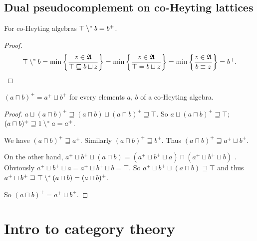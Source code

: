 \subsection{Dual pseudocomplement on co-Heyting lattices}
\begin{thm}
For co-Heyting algebras $\top\setminus^{\ast} b=b^{+}$.\end{thm}
\begin{proof}
~
\[
\top\setminus^{\ast} b=\min\left\{ \frac{z\in\mathfrak{A}}{\top\sqsubseteq b\sqcup z}\right\}=\min\left\{ \frac{z\in\mathfrak{A}}{\top=b\sqcup z}\right\}=\min\left\{ \frac{z\in\mathfrak{A}}{b\equiv z}\right\}=b^{+}.
\]
\end{proof}
\begin{thm}
$(a\sqcap b)^{+}=a^{+}\sqcup b^{+}$ for every elements $a$, $b$
of a co-Heyting algebra.\end{thm}
\begin{proof}
$a\sqcup(a\sqcap b)^{+}\sqsupseteq(a\sqcap b)\sqcup(a\sqcap b)^{+}\sqsupseteq\top$.
So $a\sqcup(a\sqcap b)^{+}\sqsupseteq\top$; $(a\sqcap b)^{+}\sqsupseteq1\setminus^{\ast} a=a^{+}$.

We have $(a\sqcap b)^{+}\sqsupseteq a^{+}$. Similarly $(a\sqcap b)^{+}\sqsupseteq b^{+}$.
Thus $(a\sqcap b)^{+}\sqsupseteq a^{+}\sqcup b^{+}$.

On the other hand, $a^{+}\sqcup b^{+}\sqcup(a\sqcap b)=(a^{+}\sqcup b^{+}\sqcup a)\sqcap(a^{+}\sqcup b^{+}\sqcup b)$
. Obviously $a^{+}\sqcup b^{+}\sqcup a=a^{+}\sqcup b^{+}\sqcup b=\top$.
So $a^{+}\sqcup b^{+}\sqcup(a\sqcap b)\sqsupseteq\top$ and thus $a^{+}\sqcup b^{+}\sqsupseteq\top\setminus^{\ast}(a\sqcap b)=(a\sqcap b)^{+}$.

So $(a\sqcap b)^{+}=a^{+}\sqcup b^{+}$.
\end{proof}

\section{Intro to category theory}


